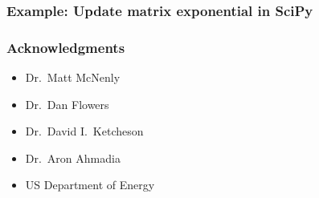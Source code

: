 \documentclass [14pt]{beamer}
\begin{document}
\begin{frame}
\frametitle{Example: Update matrix exponential in SciPy}
\end{frame}

\begin{frame}
\frametitle{Acknowledgments}
\begin{itemize}
\item Dr.\ Matt McNenly
\item Dr.\ Dan Flowers
\item Dr.\ David I.\ Ketcheson
\item Dr.\ Aron Ahmadia
\item US Department of Energy
\end{itemize}
\end{frame}

\begin{frame}
\end{frame}
\end{document}

